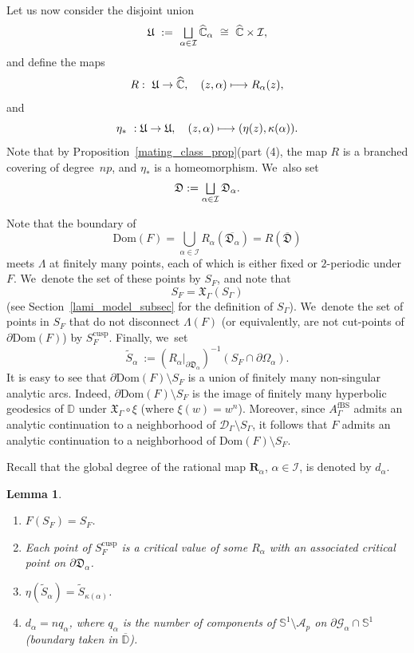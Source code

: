 \documentclass[JEP,XML,SOM,Unicode,NoFloatCountersInSection,published]{cedram}
\def\mto{\mathchoice{\longmapsto}{\mapsto}{\mapsto}{\mapsto}}
\let\oldbigsqcup\bigsqcup
\renewcommand{\bigsqcup}{\mathop{\textstyle\oldbigsqcup}\displaylimits}
\newtheorem{lemma}{Lemma}[section]
\theoremstyle{definition}
\theoremstyle{remark}
\newcommand{\C}{\mathbb{C}}
\newcommand{\D}{\mathbb{D}}
\begin{document}
Let us now consider the disjoint union
\[
\mathfrak{U}\ :=\ \bigsqcup_{\alpha\in\mathcal{I}} \widehat{\C}_{\alpha}\ \cong\ \widehat{\C}\times\mathcal{I},
\]
and define the maps
\[
R:\ \mathfrak{U}\to \widehat{\C},\quad (z,\alpha)\mto R_{\alpha}(z),
\]
and
\[
\eta_\ast\ : \mathfrak{U}\to \mathfrak{U},\quad (z,\alpha)\mto (\eta(z),\kappa(\alpha)).
\]
Note that by Proposition~\ref{mating_class_prop}(part (4), the map $R$ is a branched covering of degree~$np$, and $\eta_\ast$ is a homeomorphism. We~also set
\[
\mathfrak{D}:= \bigsqcup_{\alpha\in\mathcal{I}} \mathfrak{D}_\alpha.
\]

Note that the boundary of
\[
\mathrm{Dom}(F)=\bigcup_{\alpha\in\mathcal{I}} R_\alpha(\overline{\mathfrak{D}_\alpha}) = R(\overline{\mathfrak{D}})
\]
meets $\Lambda$ at finitely many points, each of which is either fixed or $2$-periodic under $F$. We~denote the set of these points by $S_F$, and note that
\[
S_F=\mathfrak{X}_\Gamma(S_{\Gamma})
\]
(see Section~\ref{lami_model_subsec} for the definition of $S_{\Gamma}$). We~denote the set of points in $S_F$ that do not disconnect $\Lambda(F)$ (or equivalently, are not cut-points of $\partial\mathrm{Dom}(F)$) by $S_F^{\mathrm{cusp}}$.
Finally, we~set
\[
\widetilde{S}_\alpha\ := (R_\alpha\vert_{\partial\mathfrak{D}_\alpha})^{-1}(S_F \cap \partial\Omega_\alpha).
\]
It is easy to see that $\partial\mathrm{Dom}(F)\setminus S_F$ is a union of finitely many non-singular analytic arcs. Indeed, $\partial\mathrm{Dom}(F)\setminus S_F$ is the image of finitely many hyperbolic geodesics of $\D$ under $\mathfrak{X}_\Gamma\circ\xi$ (where $\xi(w)=w^n$). Moreover, since $A_{\Gamma}^{\mathrm{fBS}}$ admits an analytic continuation to a neighborhood of $\mathcal{D}_{\Gamma}\setminus S_{\Gamma}$, it follows that $F$ admits an analytic continuation to a neighborhood of $\mathrm{Dom}(F)\setminus S_F$.

Recall that the global degree of the rational map $\pmb{R}_\alpha$, $\alpha\in\mathcal{I}$, is denoted by $d_\alpha$.

\skpt
\begin{lemma}
\begin{enumerate}
\item $F(S_F)=S_F$.

\item Each point of $S_F^{\mathrm{cusp}}$ is a critical value of some $R_\alpha$ with an associated critical point on $\partial\mathfrak{D}_\alpha$.

\item $\eta(\widetilde{S}_\alpha)=\widetilde{S}_{\kappa(\alpha)}$.

\item $d_\alpha=n q_\alpha$, where $q_\alpha$ is the number of components of $\mathbb{S}^1\setminus\mathcal{A}_p$ on $\partial\mathcal{G}_\alpha\cap\mathbb{S}^1$ (boundary taken in $\overline{\D}$).
\end{enumerate}
\label{S_F_lem}
\end{lemma}
\end{document}
